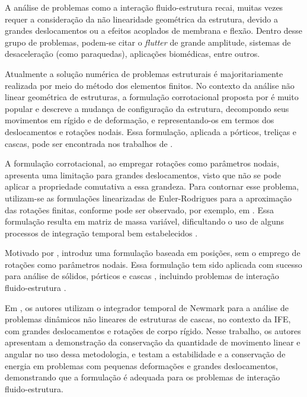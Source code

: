 \documentclass[tese_patricia.tex]{subfiles}
\begin{document}
A análise de problemas como a interação fluido-estrutura recai, muitas vezes requer a consideração da não linearidade geométrica da estrutura, devido a grandes deslocamentos ou a efeitos acoplados de membrana e flexão. Dentro desse grupo de problemas, podem-se citar o \textit{flutter} de grande amplitude, sistemas de desaceleração (como paraquedas), aplicações biomédicas, entre outros.

Atualmente a solução numérica de problemas estruturais é majoritariamente realizada por meio do método dos elementos finitos. No contexto da análise não linear geométrica de estruturas, a formulação corrotacional proposta por  é muito popular e descreve a mudança de configuração da estrutura, decompondo seus movimentos em rígido e de deformação, e representando-os em termos dos deslocamentos e rotações nodais. Essa formulação, aplicada a pórticos, treliças e cascas, pode ser encontrada nos trabalhos de .

A formulação corrotacional, ao empregar rotações como parâmetros nodais, apresenta uma limitação para grandes deslocamentos, visto que não se pode aplicar a propriedade comutativa a essa grandeza. Para contornar esse problema, utilizam-se as formulações linearizadas de Euler-Rodrigues para a aproximação das rotações finitas, conforme pode ser observado, por exemplo, em . Essa formulação resulta em matriz de massa variável, dificultando o uso de alguns processos de integração temporal bem estabelecidos \cite{SanchesC:2013}.

Motivado por ,  introduz uma formulação baseada em posições, sem o emprego de rotações como parâmetros nodais. Essa formulação tem sido aplicada com sucesso para análise de sólidos, pórticos e cascas \cite{Coda:2018, CodaG:2004,CodaP:2010,CarrazedoC:2010,CodaP:2011,SanchesC:2016}, incluindo problemas de interação fluido-estrutura \cite{SanchesC:2013,SanchesC:2014,FernandesCS:2019,AvanciniS:2020}.

Em , os autores utilizam o integrador temporal de Newmark para a análise de problemas dinâmicos não lineares de estruturas de cascas, no contexto da IFE, com grandes deslocamentos e rotações de corpo rígido. Nesse trabalho, os autores apresentam a demonstração da conservação da quantidade de movimento linear e angular no uso dessa metodologia, e testam a estabilidade e a conservação de energia em problemas com pequenas deformações e grandes deslocamentos, demonstrando que a formulação é adequada para os problemas de interação fluido-estrutura.
\end{document}
